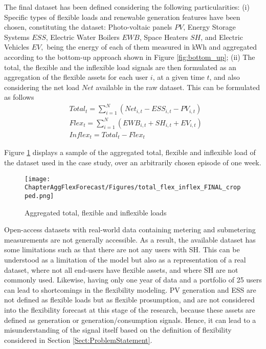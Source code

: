 The final dataset has been defined considering the following particularities: (i) Specific types of flexible loads and renewable generation features have been chosen, constituting the dataset: Photo-voltaic panels $PV$, Energy Storage Systems $ESS$, Electric Water Boilers $EWB$, Space Heaters $SH$, and Electric Vehicles $EV,$ being the energy of each of them measured in kWh and aggregated according to the bottom-up approach shown in Figure \ref{fig:bottom_up}; (ii) The total, the flexible and the inflexible load signals are then formulated as an aggregation of the flexible assets for each user $i$, at a given time $t$, and also considering the net load $Net$ available in the raw dataset. This can be formulated as follows 
\begin{subequations}
\begin{align} 
  & Total_{t} = \sum_{i=1}^{N} (Net_{i,t} - ESS_{i,t} - PV_{i,t}) \\
  & Flex_{t} = \sum_{i=1}^{N} (EWB_{i,t} +  SH_{i,t} + EV_{i,t}) \\
  & Inflex_{t} = Total_{t} - Flex_{t}
\end{align}
\end{subequations}

Figure \ref{fig:agg_load} displays a sample of the aggregated total, flexible and inflexible load of the dataset used in the case study, over an arbitrarily chosen episode of one week. 

\begin{figure}[]
\centerline{\texttt{[image: ChapterAggFlexForecast/Figures/total\_flex\_inflex\_FINAL\_cropped.png]}}
\caption{Aggregated total, flexible and inflexible loads}
\label{fig:agg_load}
\end{figure}

Open-access datasets with real-world data containing metering and submetering measurements are not generally accessible. As a result, the available dataset has some limitations such as that there are not any users with SH. This can be understood as a limitation of the model but also as a representation of a real dataset, where not all end-users have flexible assets, and where SH are not commonly used.  Likewise, having only one year of data and a portfolio of 25 users can lead to shortcomings in the flexibility modeling. PV generation and ESS are not defined as flexible loads but as flexible prosumption, and are not considered into the flexibility forecast at this stage of the research, because these assets are defined as generation or generation/consumption signals. Hence, it can lead to a misunderstanding of the signal itself based on the definition of flexibility considered in Section \ref{Sect:ProblemStatement}. 


